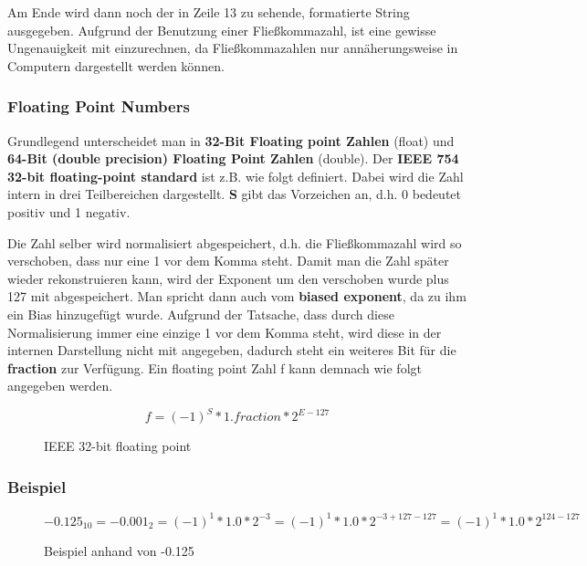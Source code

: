 \documentclass[12pt]{article}
\begin{document}


Am Ende wird dann noch der in Zeile 13 zu sehende, formatierte String ausgegeben. Aufgrund der Benutzung einer Fließkommazahl, ist eine gewisse Ungenauigkeit mit einzurechnen, da Fließkommazahlen nur annäherungsweise in Computern dargestellt werden können.

\subsubsection{Floating Point Numbers}
Grundlegend unterscheidet man in \textbf{32-Bit Floating point Zahlen} (float) und \textbf{64-Bit (double precision) Floating Point Zahlen} (double). Der \textbf{IEEE 754 32-bit floating-point standard} ist z.B. wie folgt definiert.
Dabei wird die Zahl intern in drei Teilbereichen dargestellt. \textbf{S} gibt das Vorzeichen an, d.h. 0 bedeutet positiv und 1 negativ. 

Die Zahl selber wird normalisiert abgespeichert, d.h. die Fließkommazahl wird so verschoben, dass nur eine 1 vor dem Komma steht. Damit man die Zahl später wieder rekonstruieren kann, wird der Exponent um den verschoben wurde plus 127 mit abgespeichert. Man spricht dann auch vom \textbf{biased exponent}, da zu ihm ein Bias hinzugefügt wurde. Aufgrund der Tatsache, dass durch diese Normalisierung immer eine einzige 1 vor dem Komma steht, wird diese in der internen Darstellung nicht mit angegeben, dadurch steht ein weiteres Bit für die \textbf{fraction} zur Verfügung. Ein floating point Zahl f kann demnach wie folgt angegeben werden.

\begin{figure}[H]
\begin{center}
\[f = (-1)^{S} * 1.fraction * 2^{E-127}\]
\end{center}
\label{math:ieefp:1}
\caption{IEEE 32-bit floating point}
\end{figure}

\subsubsection*{Beispiel}
\begin{figure}[H]
\begin{center}
\[
-0.125_{10} = -0.001_{2}
= (-1)^{1} * 1.0 * 2^{-3}
= (-1)^{1} * 1.0 * 2^{-3+127-127}
= (-1)^{1} * 1.0 * 2^{124-127}
\]
\end{center}
\label{math:ieefp:2}
\caption{Beispiel anhand von -0.125}
\end{figure}
\end{document}

